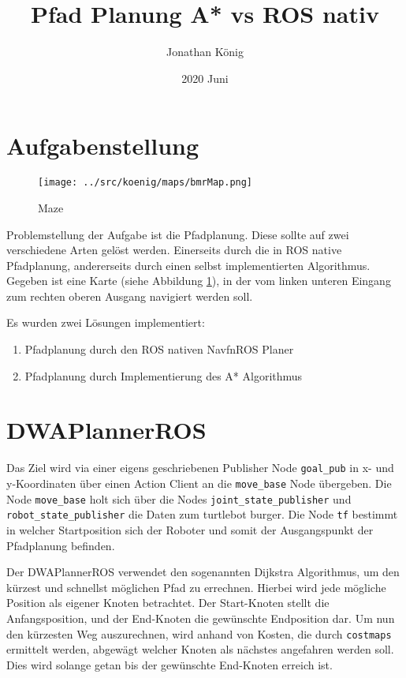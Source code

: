 \documentclass{article}
\title{Pfad Planung A* vs ROS nativ}
\date{2020 Juni}
\author{Jonathan König}
\begin{document}
\maketitle
\newpage

\tableofcontents

\newpage
\clearpage
{}



\section{Aufgabenstellung}

\begin{figure}[!htbp]
    \centering
    \texttt{[image: ../src/koenig/maps/bmrMap.png]}
    \caption{Maze}\label{map}
\end{figure}

Problemstellung der Aufgabe ist die Pfadplanung. Diese sollte auf zwei verschiedene Arten gelöst werden. Einerseits durch die in ROS native Pfadplanung, andererseits durch einen selbst implementierten Algorithmus.
Gegeben ist eine Karte (siehe Abbildung \ref{map}), in der vom linken unteren Eingang zum rechten oberen Ausgang navigiert werden soll.

Es wurden zwei Lösungen implementiert:
\begin{enumerate}
    \item Pfadplanung durch den ROS nativen NavfnROS Planer
    \item Pfadplanung durch Implementierung des A* Algorithmus 
\end{enumerate}

\section{DWAPlannerROS }
\label{DWAPlannerROS}

Das Ziel wird via einer eigens geschriebenen Publisher Node \verb|goal_pub| in x- und y-Koordinaten über einen Action Client an die \verb|move_base| Node übergeben.
Die Node \verb|move_base| holt sich über die Nodes \verb|joint_state_publisher| und \verb|robot_state_publisher| die Daten zum turtlebot burger. Die Node \verb|tf| bestimmt in welcher Startposition sich der Roboter und somit der Ausgangspunkt der Pfadplanung befinden.

Der DWAPlannerROS verwendet den sogenannten Dijkstra Algorithmus, um den kürzest und schnellst möglichen Pfad zu errechnen. Hierbei wird jede mögliche Position als eigener Knoten betrachtet. Der Start-Knoten stellt die Anfangsposition, und der End-Knoten die gewünschte Endposition dar. Um nun den kürzesten Weg auszurechnen, wird anhand von Kosten, die durch \verb|costmaps| ermittelt werden, abgewägt welcher Knoten als nächstes angefahren werden soll. Dies wird solange getan bis der gewünschte End-Knoten erreich ist. 
\end{document}
